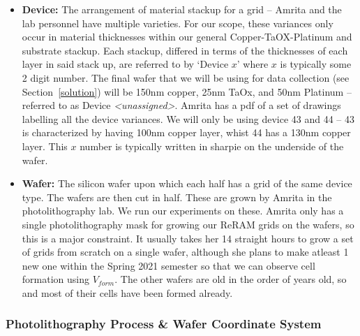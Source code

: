 \documentclass{article}
\begin{document}
\begin{itemize}
            \item [] \textbf{Device:} The arrangement of material stackup for a grid -- Amrita and the lab personnel
            have multiple varieties. For our scope, these variances only occur in material thicknesses within our
            general Copper-TaOX-Platinum and substrate stackup. Each stackup, differed in terms of the thicknesses of
            each layer in said stack up, are referred to by `Device $x$' where $x$ is typically some 2 digit number. The
            final wafer that we will be using for data collection (see Section~\ref{solution}) will be 150nm copper,
            25nm TaOx, and 50nm Platinum -- referred to as Device \textit{<unassigned>}. Amrita has a pdf of a set of
            drawings labelling all the device variances. We will only be using device 43 and 44 -- 43 is characterized
            by having 100nm copper layer, whist 44 has a 130nm copper layer. This $x$ number is typically written in
            sharpie on the underside of the wafer. 
            \item [] \textbf{Wafer:} The silicon wafer upon which each half has a grid of the same device type. The
            wafers are then cut in half. These are grown by Amrita in the photolithography lab. We run our experiments
            on these. Amrita only has a single photolithography mask for growing our ReRAM grids on the wafers, so this
            is a major constraint. It usually takes her 14 straight hours to grow a set of grids from scratch on a
            single wafer, although she plans to make atleast 1 new one within the Spring 2021 semester so that we can
            observe cell formation using $V_{form}$. The other wafers are old in the order of years old, so and most of
            their cells have been formed already.
          \end{itemize}

        \newpage
        \subsubsection{Photolithography Process \& Wafer Coordinate System} \label{coordinatesystem}
        
\end{document}
